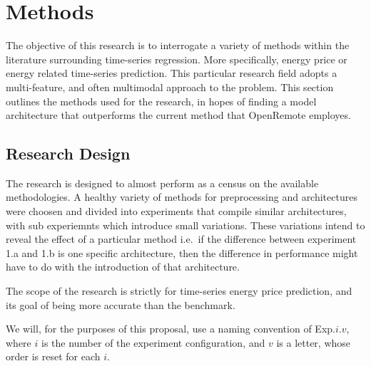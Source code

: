 
\section{Methods}

The objective of this research is to interrogate a variety of methods within the literature surrounding time-series regression. More specifically, energy price or energy related time-series prediction. This particular
research field adopts a multi-feature, and often multimodal approach to the problem. 
This section outlines the methods used for the research, in hopes of finding a model architecture that outperforms the current method that OpenRemote employes.

\subsection{Research Design}
The research is designed to almost perform as a census on the available methodologies. 
A healthy variety of methods for preprocessing and architectures were choosen and divided into experiments that compile similar architectures, with sub experiemnts which introduce small variations. These variations
intend to reveal the effect of a particular method i.e.\ if the difference between experiment 1.a and 1.b is one specific architecture, then the difference in performance might have to do with the introduction of that architecture.

The scope of the research is strictly for time-series energy price prediction, and its goal of being more accurate than the benchmark.

We will, for the purposes of this proposal, use a naming convention of Exp.$i.v$, where $i$ is the number of the experiment configuration, and
$v$ is a letter, whose order is reset for each $i$.

\begin{table}[ht]
\centering
{}
\caption{Exp.1: Model Architectures and Preprocessing}\label{tab:exp1}
\end{table}

